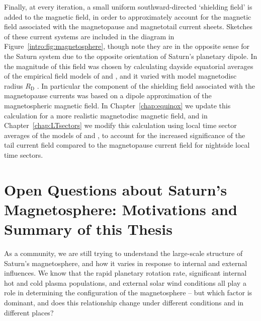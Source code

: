 Finally, at every iteration, a small uniform southward-directed `shielding field' is added to the magnetic field, in order to approximately account for the magnetic field associated with the magnetopause and magnetotail current sheets. Sketches of these current systems are included in the diagram in Figure~\ref{intro:fig:magnetosphere}, though note they are in the opposite sense for the Saturn system due to the opposite orientation of Saturn's planetary dipole. In \citet{achilleos2010a} the magnitude of this field was chosen by calculating dayside equatorial averages of the empirical field models of \citet{alexeev2005} and \citet{alexeev2006}, and it varied with model magnetodisc radius $R_\mathrm{D}$ \citep[see][Figure 6]{achilleos2010a}. In particular the component of the shielding field associated with the magnetopause currents was based on a dipole approximation of the magnetospheric magnetic field. In Chapter~\ref{chap:equinox} we update this calculation for a more realistic magnetodisc magnetic field, and in Chapter~\ref{chap:LTsectors} we modify this calculation using local time sector averages of the models of \citet{alexeev2005} and \citet{alexeev2006}, to account for the increased significance of the tail current field compared to the magnetopause current field for nightside local time sectors.

\section[Open Questions about Saturn's Magnetosphere]{Open Questions about Saturn's Magnetosphere: Motivations and Summary of this Thesis}
As a community, we are still trying to understand the large-scale structure of Saturn's magnetosphere, and how it varies in response to internal and external influences. We know that the rapid planetary rotation rate, significant internal hot and cold plasma populations, and external solar wind conditions all play a role in determining the configuration of the magnetosphere – but which factor is dominant, and does this relationship change under different conditions and in different places?

